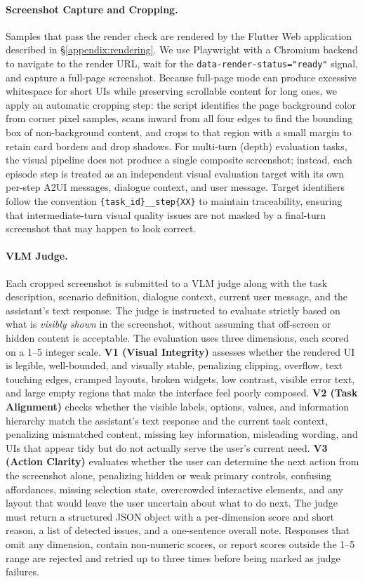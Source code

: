 \documentclass{llmxive}
\begin{document}
\paragraph{Screenshot Capture and Cropping.}
Samples that pass the render check are rendered by the Flutter Web application described in \S\ref{appendix:rendering}. We use Playwright with a Chromium backend to navigate to the render URL, wait for the \texttt{data-render-status="ready"} signal, and capture a full-page screenshot. Because full-page mode can produce excessive whitespace for short UIs while preserving scrollable content for long ones, we apply an automatic cropping step: the script identifies the page background color from corner pixel samples, scans inward from all four edges to find the bounding box of non-background content, and crops to that region with a small margin to retain card borders and drop shadows. For multi-turn (depth) evaluation tasks, the visual pipeline does not produce a single composite screenshot; instead, each episode step is treated as an independent visual evaluation target with its own per-step A2UI messages, dialogue context, and user message. Target identifiers follow the convention \texttt{\{task\_id\}\_\_step\{XX\}} to maintain traceability, ensuring that intermediate-turn visual quality issues are not masked by a final-turn screenshot that may happen to look correct.

\paragraph{VLM Judge.}
Each cropped screenshot is submitted to a VLM judge along with the task description, scenario definition, dialogue context, current user message, and the assistant's text response. The judge is instructed to evaluate strictly based on what is \emph{visibly shown} in the screenshot, without assuming that off-screen or hidden content is acceptable. The evaluation uses three dimensions, each scored on a 1--5 integer scale. \textbf{V1 (Visual Integrity)} assesses whether the rendered UI is legible, well-bounded, and visually stable, penalizing clipping, overflow, text touching edges, cramped layouts, broken widgets, low contrast, visible error text, and large empty regions that make the interface feel poorly composed. \textbf{V2 (Task Alignment)} checks whether the visible labels, options, values, and information hierarchy match the assistant's text response and the current task context, penalizing mismatched content, missing key information, misleading wording, and UIs that appear tidy but do not actually serve the user's current need. \textbf{V3 (Action Clarity)} evaluates whether the user can determine the next action from the screenshot alone, penalizing hidden or weak primary controls, confusing affordances, missing selection state, overcrowded interactive elements, and any layout that would leave the user uncertain about what to do next. The judge must return a structured JSON object with a per-dimension score and short reason, a list of detected issues, and a one-sentence overall note. Responses that omit any dimension, contain non-numeric scores, or report scores outside the 1--5 range are rejected and retried up to three times before being marked as judge failures.
\end{document}
